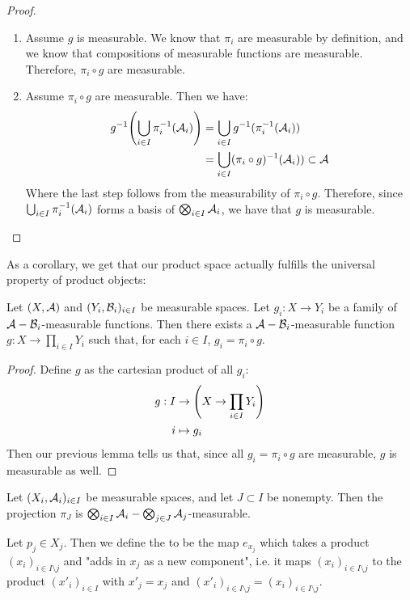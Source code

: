\begin{proof}
	\begin{enumerate}
		\item Assume $g$ is measurable. We know that $\pi_i$ are measurable by definition, and we know that compositions of measurable functions are measurable. Therefore, $\pi_i \circ g$ are measurable.
		\item Assume $\pi_i \circ g$ are measurable. Then we have:
		\begin{align*}
			g^{-1}\qty(\bigcup_{i \in I} \pi_i^{-1}(\mathcal{A}_i))
			&= \bigcup_{i \in I} g^{-1}(\pi_i^{-1}(\mathcal{A}_i))\\
			&= \bigcup_{i \in I} (\pi_i \circ g)^{-1}(\mathcal{A}_i)) \subset \mathcal{A}
		\end{align*}
		Where the last step follows from the measurability of $\pi_i \circ g$. Therefore, since $\bigcup_{i \in I} \pi_i^{-1}(\mathcal{A}_i)$ forms a basis of $\bigotimes_{i \in I} \mathcal{A}_i$, we have that $g$ is measurable.
	\end{enumerate}
\end{proof}
As a corollary, we get that our product space actually fulfills the universal property of product objects:
\begin{corollary}
	Let $(X, \mathcal{A})$ and $(Y_i, \mathcal{B}_i)_{i \in I}$ be measurable spaces. Let $g_i : X \to Y_i$ be a family of $\mathcal{A} - \mathcal{B}_i$-measurable functions. Then there exists a $\mathcal{A}-\mathcal{B}_i$-measurable function $g : X \to \prod_{i \in I} Y_i$ such that, for each $i \in I$, $g_i = \pi_i \circ g$.
\end{corollary}
\begin{proof}
	Define $g$ as the cartesian product of all $g_i$:
	\begin{align*}
		g : I &\to \qty(X \to \prod_{i \in I} Y_i)\\
		i &\mapsto g_i
	\end{align*}
	Then our previous lemma tells us that, since all $g_i = \pi_i \circ g$ are measurable, $g$ is measurable as well.
\end{proof}
\begin{corollary}
	Let $(X_i, \mathcal{A}_i)_{i \in I}$ be measurable spaces, and let $J \subset I$ be nonempty. Then the projection $\pi_J$ is $\bigotimes_{i \in I} \mathcal{A}_i-\bigotimes_{j \in J} \mathcal{A}_j$-measurable.
\end{corollary}
\begin{definition}{}
	Let $p_j \in X_j$. Then we define the  to be the map $e_{x_j}$ which takes a product $(x_i)_{i \in I \setminus j}$ and "adds in $x_j$ as a new component", i.e. it maps $(x_i)_{i \in I \setminus j}$ to the product $(x'_i)_{i \in I}$ with $x'_j = x_j$ and $(x'_i)_{i \in I \setminus j} = (x_i)_{i \in I \setminus j}$.
\end{definition}
